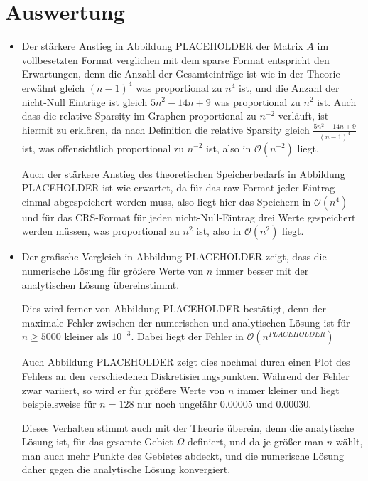\documentclass{scrartcl}
\newcommand\BigO{\mathcal{O}}
\begin{document}
\section{Auswertung}


\begin{itemize}
    \item Der stärkere Anstieg in Abbildung PLACEHOLDER der Matrix \(A\) im
          vollbesetzten Format verglichen mit dem sparse Format entspricht den
          Erwartungen, denn die Anzahl der Gesamteinträge ist wie in der
          Theorie erwähnt gleich \({(n - 1)}^4\) was proportional zu \(n^4\)
          ist, und die Anzahl der nicht-Null Einträge ist gleich \(5n^2 - 14n +
          9\) was proportional zu \(n^2\) ist. Auch dass die relative Sparsity
          im Graphen proportional zu \(n^{-2}\) verläuft, ist hiermit zu
          erklären, da nach Definition die relative Sparsity gleich
          \(\frac{5n^2 - 14n + 9}{{(n - 1)}^4}\) ist, was offensichtlich
          proportional zu \(n^{-2}\) ist, also in \(\BigO(n^{-2})\) liegt.%

          Auch der stärkere Anstieg des theoretischen Speicherbedarfs in
          Abbildung PLACEHOLDER ist wie erwartet, da für das raw-Format jeder
          Eintrag einmal abgespeichert werden muss, also liegt hier das
          Speichern in \(\BigO(n^4)\) und für das CRS-Format für jeden
          nicht-Null-Eintrag drei Werte gespeichert werden müssen, was
          proportional zu \(n^2\) ist, also in \(\BigO(n^2)\) liegt.%

    \item Der grafische Vergleich in Abbildung PLACEHOLDER zeigt, dass die
          numerische Lösung für größere Werte von \(n\) immer besser mit der
          analytischen Lösung übereinstimmt.%

          Dies wird ferner von Abbildung PLACEHOLDER bestätigt, denn der
          maximale Fehler zwischen der numerischen und analytischen Lösung ist
          für \(n \geqslant 5000\) kleiner als \(10^{-3}\). Dabei liegt der
          Fehler in \(\BigO(n^{PLACEHOLDER})\) %

          Auch Abbildung PLACEHOLDER zeigt dies nochmal durch einen Plot des
          Fehlers an den verschiedenen Diskretisierungspunkten. Während der
          Fehler zwar variiert, so wird er für größere Werte von \(n\) immer
          kleiner und liegt beispielsweise für \(n = 128\) nur noch ungefähr
          0.00005 und 0.00030.%

          Dieses Verhalten stimmt auch mit der Theorie überein, denn die
          analytische Lösung ist, für das gesamte Gebiet \(\Omega\) definiert,
          und da je größer man \(n\) wählt, man auch mehr Punkte des Gebietes
          abdeckt, und die numerische Lösung daher gegen die analytische Lösung
          konvergiert.

\end{itemize}
\end{document}
